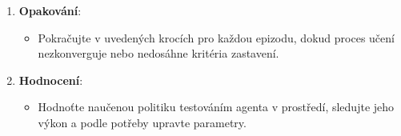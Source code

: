 \begin{enumerate}
\begin{itemize}
\begin{itemize}
\begin{itemize}
\begin{itemize}
\[                    y = r + \gamma \cdot \max_{a'} Q_{\text{target}}(s', a')
                    \]
                    kde $\gamma$ je diskontní faktor a $\max_{a'} Q_{\text{target}}(s', a')$ je maximální Q-hodnota pro následující stav $s'$ podle cílové sítě.
                    \item Aktualizujte Q-síť minimalizováním \textbf{průměrné kvadratické chyby} mezi předpovězenou Q-hodnotou a cílovou Q-hodnotou:
                    \[
                    \text{Loss} = \left( Q(s, a) - y \right)^2
                    \]
                \end{itemize}
                \item \textbf{Periodická aktualizace}: Periodicky aktualizujte váhy cílové sítě zkopírováním vah z Q-sítě.
            \end{itemize}
        \end{itemize}
    \end{itemize}
    
    \item \textbf{Opakování}:
    \begin{itemize}
        \item Pokračujte v uvedených krocích pro každou epizodu, dokud proces učení nezkonverguje nebo nedosáhne kritéria zastavení.
    \end{itemize}
    
    \item \textbf{Hodnocení}:
    \begin{itemize}
        \item Hodnoťte naučenou politiku testováním agenta v prostředí, sledujte jeho výkon a podle potřeby upravte parametry.
    \end{itemize}
\end{enumerate}

\newpage

